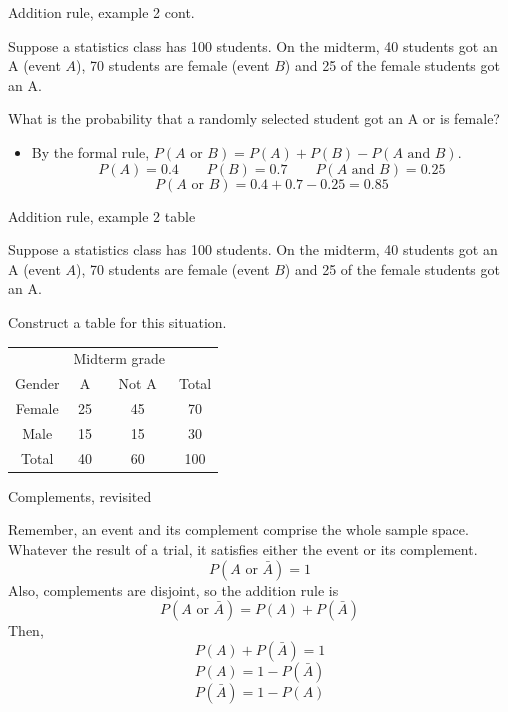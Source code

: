 \documentclass[xcolor=table, handout]{beamer}
\begin{document}
\begin{frame}{Addition rule, example 2 cont.}
\begin{block}{}
Suppose a statistics class has 100 students. On the midterm, 40 students got an A (event $A$),  70 students are female (event $B$) and 25 of the female students got an A.
\end{block}

\begin{exampleblock}{}
What is the probability that a randomly selected student got an A or is female?
\begin{itemize}
\pause
\item By the formal rule, $P(A \text{ or } B) = P(A) + P(B) - P(A \text{ and } B)$.
\[P(A) = 0.4 \qquad P(B) = 0.7 \qquad P(A \text{ and } B) = 0.25\]
\[P(A \text{ or } B) = 0.4 + 0.7 - 0.25 = 0.85\]
\end{itemize}
\end{exampleblock}
\end{frame}

\begin{frame}{Addition rule, example 2 table}
\begin{block}{}
Suppose a statistics class has 100 students. On the midterm, 40 students got an A (event $A$),  70 students are female (event $B$) and 25 of the female students got an A.
\end{block}

\begin{exampleblock}{}
Construct a table for this situation.\\
\pause
\medskip
{\centering
\begin{tabular}{c | c  c | c}
\multicolumn{1}{c}{} & \multicolumn{2}{c}{Midterm grade}\\
Gender & A & Not A & Total\\
\hline
Female & 25 & 45 & 70\\
Male & 15 & 15 & 30 \\
\hline
Total & 40 & 60 & 100
\end{tabular}\par
}
\end{exampleblock}
\end{frame}

\begin{frame}{Complements, revisited}
\begin{block}{}
Remember, an event and its complement comprise the whole sample space. Whatever the result of a trial, it satisfies either the event or its complement.
\[P(A \text{ or } \bar A) = 1 \]
\pause
Also, complements are disjoint, so the addition rule is
\[P(A \text{ or } \bar A) = P(A) + P(\bar A) \]
\pause
Then,
\[P(A) + P(\bar A) = 1 \]
\[P(A) = 1 -  P(\bar A) \]
\[P(\bar A) = 1 - P(A) \]


\end{block}
\end{frame}
\end{document}
